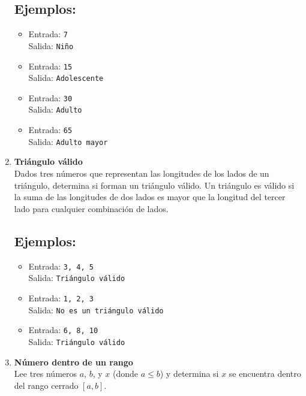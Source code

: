 \begin{enumerate}
    \subsection*{Ejemplos:}
    \begin{itemize}
        \item Entrada: \texttt{7}\\
              Salida: \texttt{Niño}
        \item Entrada: \texttt{15}\\
              Salida: \texttt{Adolescente}
        \item Entrada: \texttt{30}\\
              Salida: \texttt{Adulto}
        \item Entrada: \texttt{65}\\
              Salida: \texttt{Adulto mayor}
    \end{itemize}

    \item \textbf{Triángulo válido}\\
    Dados tres números que representan las longitudes de los lados de un triángulo, determina si forman un triángulo válido. Un triángulo es válido si la suma de las longitudes de dos lados es mayor que la longitud del tercer lado para cualquier combinación de lados.
    \subsection*{Ejemplos:}
    \begin{itemize}
        \item Entrada: \texttt{3, 4, 5}\\
              Salida: \texttt{Triángulo válido}
        \item Entrada: \texttt{1, 2, 3}\\
              Salida: \texttt{No es un triángulo válido}
        \item Entrada: \texttt{6, 8, 10}\\
              Salida: \texttt{Triángulo válido}
    \end{itemize}

    \item \textbf{Número dentro de un rango}\\
    Lee tres números \(a\), \(b\), y \(x\) (donde \(a \leq b\)) y determina si \(x\) se encuentra dentro del rango cerrado \([a, b]\).

\end{enumerate}
